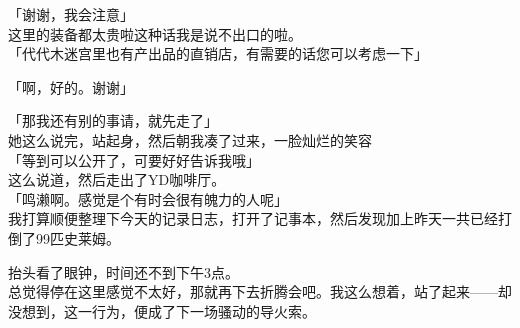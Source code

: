 「谢谢，我会注意」\\

这里的装备都太贵啦这种话我是说不出口的啦。\\

「代代木迷宫里也有产出品的直销店，有需要的话您可以考虑一下」

「啊，好的。谢谢」

「那我还有别的事请，就先走了」\\

她这么说完，站起身，然后朝我凑了过来，一脸灿烂的笑容\\

「等到可以公开了，可要好好告诉我哦」\\

这么说道，然后走出了YD咖啡厅。\\

「鸣濑啊。感觉是个有时会很有魄力的人呢」\\

我打算顺便整理下今天的记录日志，打开了记事本，然后发现加上昨天一共已经打倒了99匹史莱姆。

抬头看了眼钟，时间还不到下午3点。\\

总觉得停在这里感觉不太好，那就再下去折腾会吧。我这么想着，站了起来——却没想到，这一行为，便成了下一场骚动的导火索。\\

\sqsplit\\

